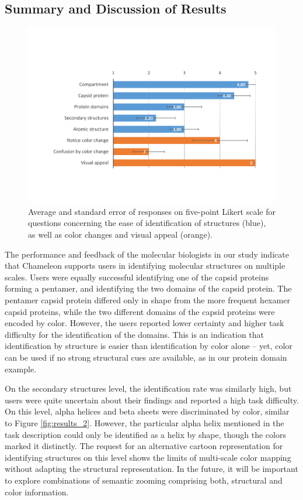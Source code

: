 \documentclass{egpubl}
\begin{document}
\subsection{Summary and Discussion of Results}
 \begin{figure}
 	\centering
 	\includegraphics[width=1.0\linewidth]{Figures/questionnaires.pdf}
 	\caption{Average and standard error of responses on five-point Likert scale for questions concerning the ease of identification of structures (blue), as well as color changes and visual appeal (orange).}
 	\label{fig:questionnaire}
 \end{figure}
The performance and feedback of the molecular biologists in our study indicate that Chameleon supports users in identifying molecular structures on multiple scales. 
Users were equally successful identifying one of the capsid proteins forming a pentamer, and identifying the two domains of the capsid protein. 
The pentamer capsid protein differed only in shape from the more frequent hexamer capsid proteins, while the two different domains of the capsid proteins were encoded by color. 
However, the users reported lower certainty and higher task difficulty for the identification of the domains.
This is an indication that identification by structure is easier than identification by color alone -- yet, color can be used if no strong structural cues are available, as in our protein domain example.

On the secondary structures level, the identification rate was similarly high, but users were quite uncertain about their findings and reported a high task difficulty. 
On this level, alpha helices and beta sheets were discriminated by color, similar to Figure \ref{fig:results_2}. 
However, the particular alpha helix mentioned in the task description could only be identified as a helix by shape, though the colors marked it distinctly. 
The request for an alternative cartoon representation for identifying structures on this level shows the limits of multi-scale color mapping without adapting the structural representation. 
In the future, it will be important to explore combinations of semantic zooming comprising both, structural and color information. 
\end{document}
